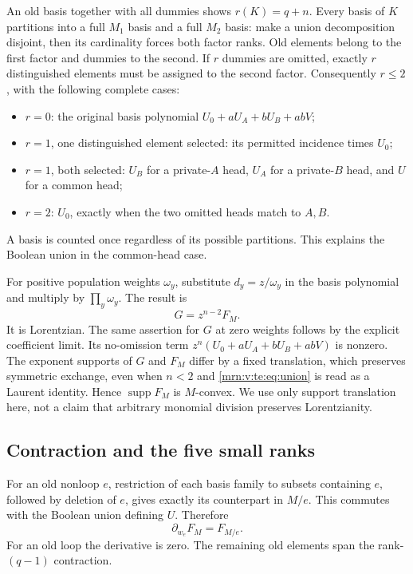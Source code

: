 \documentclass[11pt,a4paper]{article}
\theoremstyle{remark}\newtheorem{remark}[theorem]{Remark}
\newcommand{\supp}{\operatorname{supp}}    %
\begin{document}
An old basis together with all dummies shows $r(K)=q+n$. Every basis of $K$ partitions into a full $M_1$ basis and a full $M_2$ basis: make a union decomposition disjoint, then its cardinality forces both factor ranks. Old elements belong to the first factor and dummies to the second. If $r$ dummies are omitted, exactly $r$ distinguished elements must be assigned to the second factor. Consequently $r\le2$, with the following complete cases:
\begin{itemize}\setlength{\itemsep}{0pt}
\item $r=0$: the original basis polynomial $U_0+aU_A+bU_B+abV$;
\item $r=1$, one distinguished element selected: its permitted incidence times $U_0$;
\item $r=1$, both selected: $U_B$ for a private-$A$ head, $U_A$ for a private-$B$ head, and $U$ for a common head;
\item $r=2$: $U_0$, exactly when the two omitted heads match to $A,B$.
\end{itemize}
A basis is counted once regardless of its possible partitions. This explains the Boolean union in the common-head case.

For positive population weights $\omega_y$, substitute $d_y=z/\omega_y$ in the basis polynomial and multiply by $\prod_y\omega_y$. The result is
\begin{equation}\label{mrn:v:te:eq:union}
 G=z^{n-2}F_M.
\end{equation}
It is Lorentzian. The same assertion for $G$ at zero weights follows by the explicit coefficient limit. Its no-omission term $z^n(U_0+aU_A+bU_B+abV)$ is nonzero. The exponent supports of $G$ and $F_M$ differ by a fixed translation, which preserves symmetric exchange, even when $n<2$ and \eqref{mrn:v:te:eq:union} is read as a Laurent identity. Hence $\supp F_M$ is $M$-convex. We use only support translation here, not a claim that arbitrary monomial division preserves Lorentzianity.

\subsection{Contraction and the five small ranks}\label{mrn:v:te:sec:induction}
For an old nonloop $e$, restriction of each basis family to subsets containing $e$, followed by deletion of $e$, gives exactly its counterpart in $M/e$. This commutes with the Boolean union defining $U$. Therefore
\begin{equation}\label{mrn:v:te:eq:contract}
 \partial_{w_e}F_M=F_{M/e}.
\end{equation}
For an old loop the derivative is zero. The remaining old elements span the rank-$(q-1)$ contraction.
\end{document}
